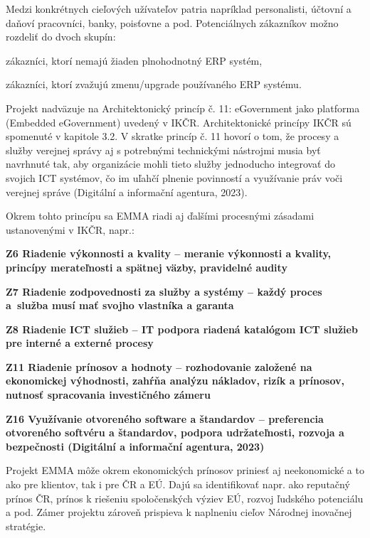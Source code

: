 Medzi konkrétnych cieľových užívateľov patria napríklad personalisti, účtovní a daňoví pracovníci, banky, poisťovne a pod. Potenciálnych zákazníkov možno rozdeliť do dvoch skupín: 

\startitemize[a]
\item{zákazníci, ktorí nemajú žiaden plnohodnotný ERP systém,}
\item{zákazníci, ktorí zvažujú zmenu/upgrade používaného ERP systému.}
\stopitemize

Projekt nadväzuje na Architektonický princíp č. 11: eGovernment jako platforma (Embedded eGovernment) uvedený v IKČR. Architektonické princípy IKČR sú spomenuté v kapitole 3.2. V skratke princíp č. 11 hovorí o tom, že procesy a služby verejnej správy aj s potrebnými technickými nástrojmi musia byť navrhnuté tak, aby organizácie mohli tieto služby jednoducho integrovať do svojich ICT systémov, čo im uľahčí plnenie povinností a využívanie práv voči verejnej správe \scr(Digitální a informační agentura, 2023).

Okrem tohto princípu sa EMMA riadi aj ďalšími procesnými zásadami ustanovenými v IKČR, napr.: 

\startitemize
\item \start\bf Z6 Riadenie výkonnosti a kvality \stop --  meranie výkonnosti a kvality, princípy merateľnosti a spätnej väzby, pravidelné audity
\item \start\bf Z7 Riadenie zodpovednosti za služby a systémy \stop -- každý proces a~služba musí mať svojho vlastníka a garanta
\item  \start\bf Z8 Riadenie ICT služieb \stop -- IT podpora riadená katalógom ICT služieb pre interné a externé procesy
\item \start\bf Z11 Riadenie prínosov a hodnoty \stop -- rozhodovanie založené na ekonomickej výhodnosti, zahŕňa analýzu nákladov, rizík a prínosov, nutnosť spracovania investičného zámeru
\item \start\bf Z16 Využívanie otvoreného software a štandardov \stop -- preferencia otvoreného softvéru a štandardov, podpora udržateľnosti, rozvoja a bezpečnosti  \scr(Digitální a informační agentura, 2023)
\stopitemize

Projekt EMMA môže okrem ekonomických prínosov priniesť aj neekonomické a to ako pre klientov, tak i pre ČR a EÚ. Dajú sa identifikovať napr. ako reputačný prínos ČR, prínos k riešeniu spoločenských výziev EÚ, rozvoj ľudského potenciálu a pod. Zámer projektu zároveň prispieva k naplneniu cieľov Národnej inovačnej stratégie.

